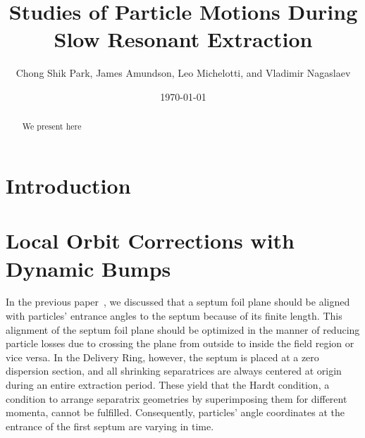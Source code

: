 \documentclass[aps,prstab,onecolumn,preprint,endfloats,11pt]{revtex4-1}
\begin{document}
\title{Studies of Particle Motions During Slow Resonant Extraction}
\author{Chong Shik Park, James Amundson, Leo Michelotti, and Vladimir Nagaslaev}
\date{\today}

\begin{abstract}
We present here 
\end{abstract}

\pacs{}
\maketitle

\setcounter{tocdepth}{5}


\section{\label{sec:intro}Introduction}

\clearpage

\section{\label{sec:bump}Local Orbit Corrections with Dynamic Bumps}

In the previous paper~\cite{mu2e}, we discussed that a septum foil plane should be aligned with particles' entrance angles to the septum because of its finite length.
This alignment of the septum foil plane should be optimized in the manner of reducing particle losses due to crossing the plane from outside to inside the field region or vice versa.
In the Delivery Ring, however, the septum is placed at a zero dispersion section, and all shrinking separatrices are always centered at origin during an entire extraction period.
These yield that the Hardt condition, a condition to arrange separatrix geometries by superimposing them for different momenta, cannot be fulfilled.
Consequently, particles' angle coordinates at the entrance of the first septum are varying in time.
\end{document}
